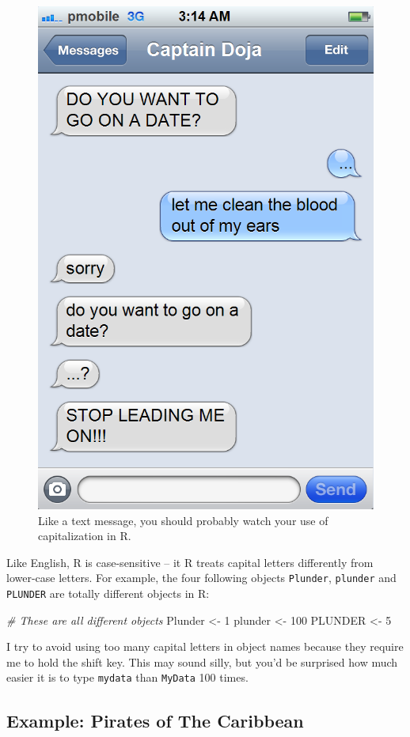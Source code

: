 \documentclass[]{book}
\newenvironment{Shaded}{\begin{snugshade}}{\end{snugshade}}
\newcommand{\DecValTok}[1]{\textcolor[rgb]{0.00,0.00,0.81}{#1}}
\newcommand{\StringTok}[1]{\textcolor[rgb]{0.31,0.60,0.02}{#1}}
\newcommand{\CommentTok}[1]{\textcolor[rgb]{0.56,0.35,0.01}{\textit{#1}}}
\newcommand{\NormalTok}[1]{#1}
\theoremstyle{definition}
\theoremstyle{definition}
\theoremstyle{remark}
\begin{document}
\begin{figure}

{\centering \includegraphics[width=0.5\linewidth]{images/datetext} 

}

\caption{Like a text message, you should probably watch your use of capitalization in R.}\label{fig:datetext}
\end{figure}

Like English, R is case-sensitive -- it R treats capital letters
differently from lower-case letters. For example, the four following
objects \texttt{Plunder}, \texttt{plunder} and \texttt{PLUNDER} are
totally different objects in R:

\begin{Shaded}
\begin{Highlighting}[]
\CommentTok{# These are all different objects}
\NormalTok{Plunder <-}\StringTok{ }\DecValTok{1}
\NormalTok{plunder <-}\StringTok{ }\DecValTok{100}
\NormalTok{PLUNDER <-}\StringTok{ }\DecValTok{5}
\end{Highlighting}
\end{Shaded}

I try to avoid using too many capital letters in object names because
they require me to hold the shift key. This may sound silly, but you'd
be surprised how much easier it is to type \texttt{mydata} than
\texttt{MyData} 100 times.

\subsection{Example: Pirates of The
Caribbean}\label{example-pirates-of-the-caribbean}
\end{document}
